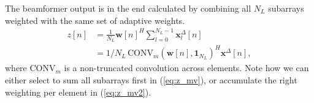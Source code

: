 \documentclass[journal]{IEEEtran}
\newcommand{\mat}[1]{\mathbf{#1}}
\renewcommand{\vec}[1]{\mathbf{#1}}
\begin{document}
The beamformer output is in the end calculated by combining all $N_L$ subarrays weighted with the same set of adaptive weights.
\begin{align}
z[n] &= \frac{1}{N_L}\vec{w}[n]^H \sum_{l=0}^{N_L-1} \vec{x}_l^{\Delta}[n] \label{eq:z_mv}\\
&= 1/N_L \, \text{CONV}_m(\vec{w}[n], \vec{1}_{N_L})^H\vec{x}^{\Delta}[n] \label{eq:z_mv2},
\end{align}
where $\text{CONV}_m$ is a non-truncated convolution across elements.
Note how we can either select to sum all subarrays first in (\ref{eq:z_mv}), or accumulate the right weighting per element in (\ref{eq:z_mv2}).



\end{document}
